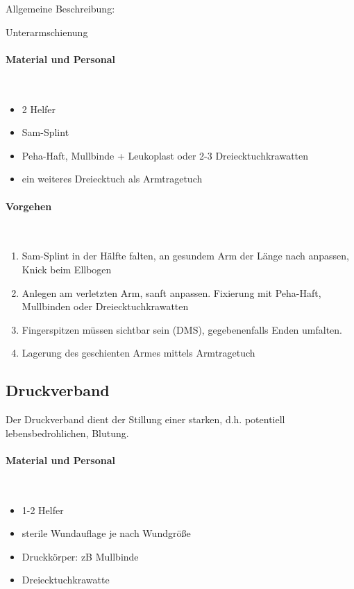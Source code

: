 Allgemeine
Beschreibung: 

Unterarmschienung

\paragraph*{Material und Personal}~

\begin{itemize}
    \item 2 Helfer
    \item Sam-Splint
    \item Peha-Haft, Mullbinde + Leukoplast oder 2-3 Dreiecktuchkrawatten
    \item ein weiteres Dreiecktuch als Armtragetuch
\end{itemize}


\paragraph*{Vorgehen}~

\begin{enumerate}
    \item Sam-Splint in der Hälfte falten, an gesundem Arm der Länge
    nach anpassen, Knick beim Ellbogen
    \item Anlegen am verletzten Arm, sanft anpassen. Fixierung mit
    Peha-Haft, Mullbinden oder Dreiecktuchkrawatten
    \item Fingerspitzen müssen sichtbar sein (DMS), gegebenenfalls Enden
    umfalten.
    \item Lagerung des geschienten Armes mittels Armtragetuch
\end{enumerate}



\subsection{Druckverband}
\label{topic:druckverband-anlegen}

Der Druckverband dient der Stillung einer starken, d.h.
potentiell lebensbedrohlichen, Blutung.

\paragraph*{Material und Personal}~

\begin{itemize}
    \item 1-2 Helfer
    \item sterile Wundauflage je nach Wundgröße
    \item Druckkörper: zB Mullbinde
    \item Dreiecktuchkrawatte
\end{itemize}

